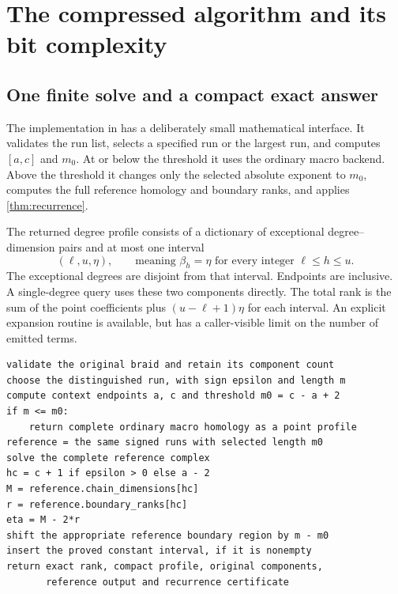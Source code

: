 \section{The compressed algorithm and its bit complexity}\label{sec:algorithm}

\subsection{One finite solve and a compact exact answer}

The implementation in  has a deliberately small
mathematical interface. It validates the run list, selects a specified run
or the largest run, and computes \([a,c]\) and \(m_0\). At or below the threshold
it uses the ordinary macro backend. Above the threshold it changes
only the selected absolute exponent to \(m_0\), computes the full reference
homology and boundary ranks, and applies \cref{thm:recurrence}.

The returned degree profile consists of a dictionary of exceptional
degree--dimension pairs and at most one interval
\[
(\ell,u,\eta),\qquad
\text{meaning }\beta_h=\eta\text{ for every integer }\ell\le h\le u.
\]
The exceptional degrees are disjoint from that interval. Endpoints are
inclusive. A single-degree query uses these two components directly.
The total rank is the sum of the point coefficients plus
\((u-\ell+1)\eta\) for each interval. An explicit expansion routine is
available, but has a caller-visible limit on the number of emitted terms.

\begin{center}
\begin{minipage}{0.94\linewidth}
\begin{lstlisting}
validate the original braid and retain its component count
choose the distinguished run, with sign epsilon and length m
compute context endpoints a, c and threshold m0 = c - a + 2
if m <= m0:
    return complete ordinary macro homology as a point profile
reference = the same signed runs with selected length m0
solve the complete reference complex
hc = c + 1 if epsilon > 0 else a - 2
M = reference.chain_dimensions[hc]
r = reference.boundary_ranks[hc]
eta = M - 2*r
shift the appropriate reference boundary region by m - m0
insert the proved constant interval, if it is nonempty
return exact rank, compact profile, original components,
       reference output and recurrence certificate
\end{lstlisting}
\end{minipage}
\end{center}

